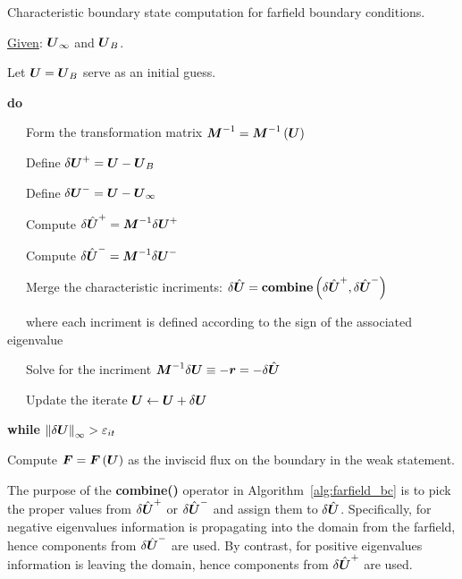 \begin{algorithm}[!htb]
  \centering
  \begin{minipage}{.95\textwidth}
    \caption{Characteristic boundary state computation for farfield boundary conditions.\label{alg:farfield_bc}}
    \noindent
    \sffamily
    \begin{list}{:\ \ }{}
        \renewcommand{\baselinestretch}{1.} \setlength{\itemsep}{-.5ex}
	\item[] \underline{Given}: $\bv{U}_\infty$ and $\bv{U}_B$.
        \item Let $\bv{U} = \bv{U}_B$ serve as an initial guess.
 	\item \textbf{do}
 	\item \ \ \ Form the transformation matrix $\bt{M}^{-1}=\bt{M}^{-1}\left(\bv{U}\right)$
 	\item \ \ \ Define $\delta{\bv{U}^{+}} = \bv{U}-\bv{U}_B$
 	\item \ \ \ Define $\delta{\bv{U}^{-}} = \bv{U}-\bv{U}_\infty$
        \item \ \ \ Compute $\delta{\hat{\bv{U}}^{+}} = \bt{M}^{-1}\delta{\bv{U}^{+}}$
        \item \ \ \ Compute $\delta{\hat{\bv{U}}^{-}} = \bt{M}^{-1}\delta{\bv{U}^{-}}$
        \item \ \ \ Merge the characteristic incriments: $\delta{\hat{\bv{U}}} = \text{\bf combine}\left(\delta{\hat{\bv{U}}^{+}},\delta{\hat{\bv{U}}^{-}}\right)$
        \item[] \ \ \ where each incriment is defined according to the sign of the associated eigenvalue
        \item \ \ \ Solve for the incriment $\bt{M}^{-1}\delta{\bv{U}} \equiv -\bv{r} =  -\delta{\hat{\bv{U}}}$
	\item \ \ \ Update the iterate  $\bv{U} \leftarrow \bv{U} + \delta{\bv{U}}$
 	\item \textbf{while} $\norm[\infty]{\delta{\bv{U}}} > \varepsilon_{it}$
        \item Compute $\bv{F}=\bv{F}\left(\bv{U}\right)$ as the inviscid flux on the boundary in the weak statement.
    \end{list}
  \end{minipage}
\end{algorithm}
The purpose of the {\sffamily \bf combine()} operator in Algorithm~\eqref{alg:farfield_bc} is to pick the proper values from $\delta{\hat{\bv{U}}^{+}}$ or $\delta{\hat{\bv{U}}^{-}}$ and assign them to $\delta{\hat{\bv{U}}}$.  Specifically, for negative eigenvalues information is propagating into the domain from the farfield, hence components from $\delta{\hat{\bv{U}}^{-}}$ are used.  By contrast, for positive eigenvalues information is leaving the domain, hence components from $\delta{\hat{\bv{U}}^{+}}$ are used.

